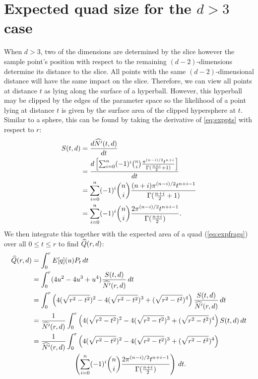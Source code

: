 \section{Expected quad size for the $d>3$ case}


When $d>3$, two of the dimensions are determined by the slice however the
sample point's position with respect to the remaining $(d-2)$-dimensions 
determine its distance to the slice.  All points with the same 
$(d-2)$-dimensional distance will have the same impact on the slice.
Therefore, we can view all points at distance $t$ as lying along the surface 
of a hyperball.  However, this hyperball may be clipped by the edges of the
parameter space so the likelihood of a point lying at distance $t$ is given
by the surface area of the clipped hypersphere at $t$.  Similar to a sphere,
this can be found by taking the derivative of \autoref{eq:exppts} with 
respect to $r$:
\begin{align*}
 S(t,d) 
   &= \frac{d \widehat{N'}(t, d)}{d t} \\
   &= \frac{d \left[
    \sum_{i=0}^{n} (-1)^{i} {n \choose i}
         \frac{\pi^{(n-i)/2}t^{n+i}}{\Gamma(\frac{n+i}{2} + 1)} 
 \right]}{dt} \\
   &= \sum_{i=0}^{n} (-1)^{i} {n \choose i}
         \frac{(n+i)\pi^{(n-i)/2}t^{n+i-1}}{\Gamma(\frac{n+i}{2} + 1)} \\
   &= \sum_{i=0}^{n} (-1)^{i} {n \choose i}
         \frac{2\pi^{(n-i)/2}t^{n+i-1}}{\Gamma(\frac{n+i}{2})} 
         \text{.}
\end{align*}
We then integrate this
together with the expected area of a quad (\autoref{eq:expfrags}) over
all $0 \le t \le r$ to find $\widehat{Q}(r,d)$:
\begin{align*}
\widehat{Q}(r,d) &= \int_0^r E[q](u) P_t \, dt \\
     &= \int_0^r (4u^2 - 4u^3 + u^4)
        \frac{S(t,d)}{\widehat{N'}(r, d)} \, dt \\
     &= \int_0^r 
        \left(4(\sqrt{r^2-t^2})^2 - 4(\sqrt{r^2-t^2})^3 + (\sqrt{r^2-t^2})^4\right)
        \frac{S(t,d)}{\widehat{N'}(r, d)} \, dt \\
     &= \frac{1}{\widehat{N'}(r, d)} \int_0^r 
        \left(4(\sqrt{r^2-t^2})^2 - 4(\sqrt{r^2-t^2})^3 + (\sqrt{r^2-t^2})^4\right)
        S(t,d) \, dt \\
     &= \frac{1}{\widehat{N'}(r, d)} \int_0^r 
        \left(4(\sqrt{r^2-t^2})^2 - 4(\sqrt{r^2-t^2})^3 + (\sqrt{r^2-t^2})^4\right) \\
     &\qquad\qquad\qquad
       \left(
           \sum_{i=0}^{n} (-1)^{i} {n \choose i}
               \frac{2\pi^{(n-i)/2}t^{n+i-1}}{\Gamma(\frac{n+i}{2})} 
        \right) \, dt 
        \text{.}
\end{align*}

